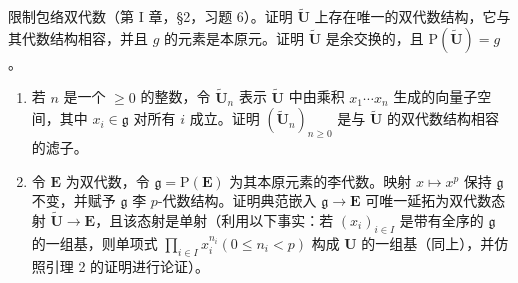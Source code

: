 限制包络双代数（第 I 章，§2，习题 6）。证明 \(\tilde{\mathbf{U}}\) 上存在唯一的双代数结构，它与其代数结构相容，并且 \(g\) 的元素是本原元。证明 \(\tilde{\mathbf{U}}\) 是余交换的，且 \(\mathrm{P}(\tilde{\mathbf{U}}) = g\)。

\begin{enumerate}
\def\labelenumi{(\alph{enumi})}
\setcounter{enumi}{1}
\item
  若 \(n\) 是一个 \(\geqslant 0\) 的整数，令 \(\tilde{\mathbf{U}}_n\) 表示 \(\tilde{\mathbf{U}}\) 中由乘积 \(x_1\cdots x_n\) 生成的向量子空间，其中 \(x_i \in \mathfrak{g}\) 对所有 \(i\) 成立。证明 \((\tilde{\mathbf{U}}_n)_{n \geqslant 0}\) 是与 \(\tilde{\mathbf{U}}\) 的双代数结构相容的滤子。
\item
  令 \(\mathbf{E}\) 为双代数，令 \(\mathfrak{g} = \mathrm{P}(\mathbf{E})\) 为其本原元素的李代数。映射 \(x\mapsto x^p\) 保持 \(\mathfrak{g}\) 不变，并赋予 \(\mathfrak{g}\) 李 \(p\)-代数结构。证明典范嵌入 \(\mathfrak{g}\to \mathbf{E}\) 可唯一延拓为双代数态射 \(\tilde{\mathbf{U}}\rightarrow \mathbf{E}\)，且该态射是单射（利用以下事实：若 \((x_{i})_{i\in I}\) 是带有全序的 \(\mathfrak{g}\) 的一组基，则单项式 \(\prod_{i\in I}x_i^{n_i}(0\leqslant n_i < p)\) 构成 \(\mathbf{U}\) 的一组基（同上），并仿照引理 2 的证明进行论证）。
\end{enumerate}
\relax{}
